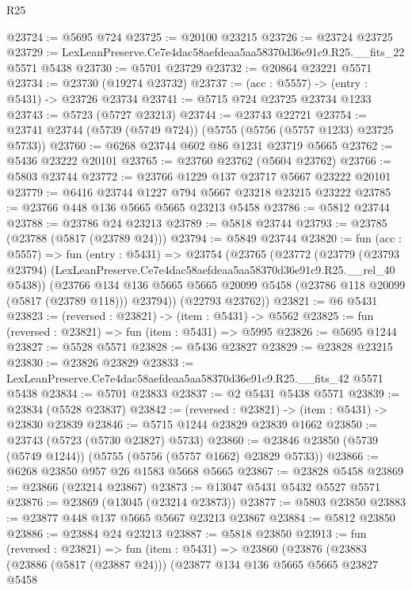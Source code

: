 \begin{lexlean}{R25}
\begin{coremodule}
@23724 := @5695 @724
@23725 := @20100 @23215
@23726 := @23724 @23725
@23729 := LexLeanPreserve.Ce7e4dac58aefdeaa5aa58370d36e91c9.R25.__fits_22 @5571 @5438
@23730 := @5701 @23729
@23732 := @20864 @23221 @5571
@23734 := @23730 (@19274 @23732)
@23737 := (acc : @5557) -> (entry : @5431) -> @23726 @23734
@23741 := @5715 @724 @23725 @23734 @1233
@23743 := @5723 (@5727 @23213)
@23744 := @23743 @22721
@23754 := @23741 @23744 (@5739 (@5749 @724)) (@5755 (@5756 (@5757 @1233) @23725 @5733))
@23760 := @6268 @23744 @602 @86 @1231 @23719 @5665
@23762 := @5436 @23222 @20101
@23765 := @23760 @23762 (@5604 @23762)
@23766 := @5803 @23744
@23772 := @23766 @1229 @137 @23717 @5667 @23222 @20101
@23779 := @6416 @23744 @1227 @794 @5667 @23218 @23215 @23222
@23785 := @23766 @448 @136 @5665 @5665 @23213 @5458
@23786 := @5812 @23744
@23788 := @23786 @24 @23213
@23789 := @5818 @23744
@23793 := @23785 (@23788 (@5817 (@23789 @24)))
@23794 := @5849 @23744
@23820 := fun (acc : @5557) =>
  fun (entry : @5431) =>
  @23754
    (@23765
      (@23772
        (@23779
          (@23793 @23794)
          (LexLeanPreserve.Ce7e4dac58aefdeaa5aa58370d36e91c9.R25.__rel_40 @5438))
        (@23766
          @134
          @136
          @5665
          @5665
          @20099
          @5458
          (@23786 @118 @20099 (@5817 (@23789 @118)))
          @23794))
      (@22793 @23762))
@23821 := @6 @5431
@23823 := (reversed : @23821) -> (item : @5431) -> @5562
@23825 := fun (reversed : @23821) => fun (item : @5431) => @5995
@23826 := @5695 @1244
@23827 := @5528 @5571
@23828 := @5436 @23827
@23829 := @23828 @23215
@23830 := @23826 @23829
@23833 := LexLeanPreserve.Ce7e4dac58aefdeaa5aa58370d36e91c9.R25.__fits_42 @5571 @5438
@23834 := @5701 @23833
@23837 := @2 @5431 @5438 @5571
@23839 := @23834 (@5528 @23837)
@23842 := (reversed : @23821) -> (item : @5431) -> @23830 @23839
@23846 := @5715 @1244 @23829 @23839 @1662
@23850 := @23743 (@5723 (@5730 @23827) @5733)
@23860 := @23846 @23850 (@5739 (@5749 @1244)) (@5755 (@5756 (@5757 @1662) @23829 @5733))
@23866 := @6268 @23850 @957 @26 @1583 @5668 @5665
@23867 := @23828 @5458
@23869 := @23866 (@23214 @23867)
@23873 := @13047 @5431 @5432 @5527 @5571
@23876 := @23869 (@13045 (@23214 @23873))
@23877 := @5803 @23850
@23883 := @23877 @448 @137 @5665 @5667 @23213 @23867
@23884 := @5812 @23850
@23886 := @23884 @24 @23213
@23887 := @5818 @23850
@23913 := fun (reversed : @23821) =>
  fun (item : @5431) =>
  @23860
    (@23876
      (@23883
        (@23886 (@5817 (@23887 @24)))
        (@23877
          @134
          @136
          @5665
          @5665
          @23827
          @5458

\end{coremodule}
\end{lexlean}

